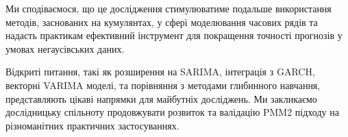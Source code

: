 \documentclass[12pt,a4paper]{article}
\begin{document}
	Ми сподіваємося, що це дослідження стимулюватиме подальше використання методів, заснованих на кумулянтах, у сфері моделювання часових рядів та надасть практикам ефективний інструмент для покращення точності прогнозів у умовах негаусівських даних.
	
	Відкриті питання, такі як розширення на SARIMA, інтеграція з GARCH, векторні VARIMA моделі, та порівняння з методами глибинного навчання, представляють цікаві напрямки для майбутніх досліджень. Ми закликаємо дослідницьку спільноту продовжувати розвиток та валідацію PMM2 підходу на різноманітних практичних застосуваннях.
	
	
	
	
	
\end{document}
